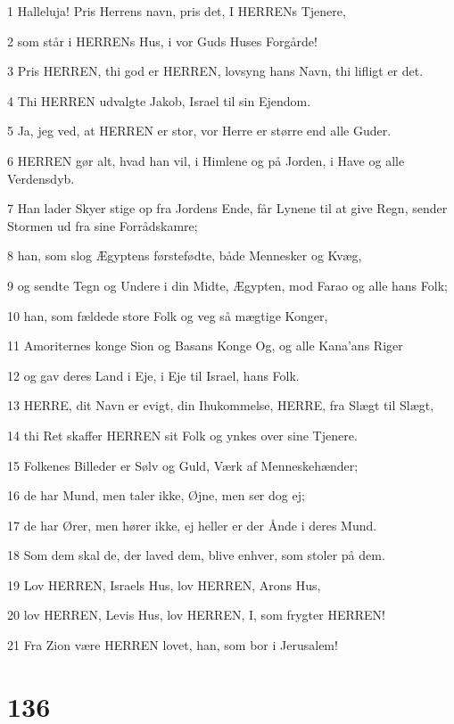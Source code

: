 \par 1 Halleluja! Pris Herrens navn, pris det, I HERRENs Tjenere,
\par 2 som står i HERRENs Hus, i vor Guds Huses Forgårde!
\par 3 Pris HERREN, thi god er HERREN, lovsyng hans Navn, thi lifligt er det.
\par 4 Thi HERREN udvalgte Jakob, Israel til sin Ejendom.
\par 5 Ja, jeg ved, at HERREN er stor, vor Herre er større end alle Guder.
\par 6 HERREN gør alt, hvad han vil, i Himlene og på Jorden, i Have og alle Verdensdyb.
\par 7 Han lader Skyer stige op fra Jordens Ende, får Lynene til at give Regn, sender Stormen ud fra sine Forrådskamre;
\par 8 han, som slog Ægyptens førstefødte, både Mennesker og Kvæg,
\par 9 og sendte Tegn og Undere i din Midte, Ægypten, mod Farao og alle hans Folk;
\par 10 han, som fældede store Folk og veg så mægtige Konger,
\par 11 Amoriternes konge Sion og Basans Konge Og, og alle Kana'ans Riger
\par 12 og gav deres Land i Eje, i Eje til Israel, hans Folk.
\par 13 HERRE, dit Navn er evigt, din Ihukommelse, HERRE, fra Slægt til Slægt,
\par 14 thi Ret skaffer HERREN sit Folk og ynkes over sine Tjenere.
\par 15 Folkenes Billeder er Sølv og Guld, Værk af Menneskehænder;
\par 16 de har Mund, men taler ikke, Øjne, men ser dog ej;
\par 17 de har Ører, men hører ikke, ej heller er der Ånde i deres Mund.
\par 18 Som dem skal de, der laved dem, blive enhver, som stoler på dem.
\par 19 Lov HERREN, Israels Hus, lov HERREN, Arons Hus,
\par 20 lov HERREN, Levis Hus, lov HERREN, I, som frygter HERREN!
\par 21 Fra Zion være HERREN lovet, han, som bor i Jerusalem!

\chapter{136}

